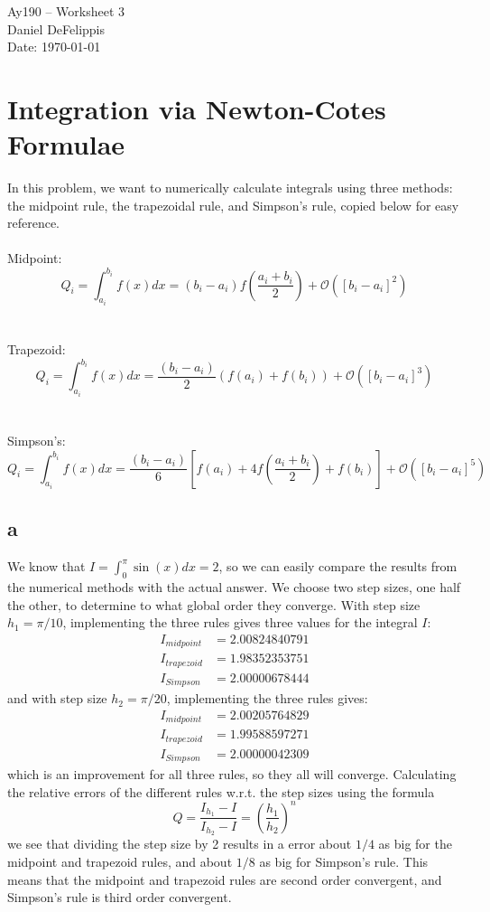 \documentclass[11pt,letterpaper]{article}
\begin{document}
\begin{center}
\Large
Ay190 -- Worksheet 3\\
Daniel DeFelippis\\
Date: \today
\end{center}


\section{Integration via Newton-Cotes Formulae}
In this problem, we want to numerically calculate integrals using 
three methods: the midpoint rule, the trapezoidal rule, and Simpson's rule, copied below for easy reference. 
\\
\\
Midpoint: $$Q_i = \int_{a_i}^{b_i} f(x)dx = 
(b_i - a_i)f\left(\frac{a_i + b_i}{2}\right) + \mathcal{O}([b_i - a_i]^2) $$
\\
\\
Trapezoid: $$Q_i = \int_{a_i}^{b_i} f(x)dx = 
\frac{(b_i - a_i)}{2}(f(a_i) + f(b_i)) + \mathcal{O}([b_i - a_i]^3) $$
\\
\\
Simpson's: $$Q_i = \int_{a_i}^{b_i} f(x)dx = 
\frac{(b_i - a_i)}{6}\left[ f(a_i) + 4f\left(\frac{a_i + b_i}{2}\right) +
f(b_i) \right] + \mathcal{O}([b_i - a_i]^5) $$

\subsection*{a}
We know that $I = \int_{0}^{\pi} \sin(x) dx = 2$, so we can easily compare 
the results from the numerical methods with the actual answer. We choose two
step sizes, one half the other, to determine to what global order they converge. 
With step size $h_1 = \pi / 10$, implementing the three rules gives three values for the integral $I$:
\begin{align*}
I_{midpoint} &= 2.00824840791 \\
I_{trapezoid} &= 1.98352353751 \\
I_{Simpson} &= 2.00000678444
\end{align*}
and with step size $h_2 = \pi / 20$, implementing the three rules gives:
\begin{align*}
I_{midpoint} &= 2.00205764829 \\
I_{trapezoid} &= 1.99588597271 \\
I_{Simpson} &= 2.00000042309
\end{align*}
which is an improvement for all three rules, so they all will converge.
Calculating the relative errors of the different rules w.r.t. the step sizes using the formula $$Q = \frac{I_{h_1} - I}{I_{h_2} - I} = \left( \frac{h_1}{h_2} \right)^n$$
we see that dividing the step size by 2 results in a error about $1/4$ as big for the midpoint and trapezoid rules, and about $1/8$ as big for Simpson's
rule. This means that the midpoint and trapezoid rules are second order
convergent, and Simpson's rule is third order convergent.
\end{document}
